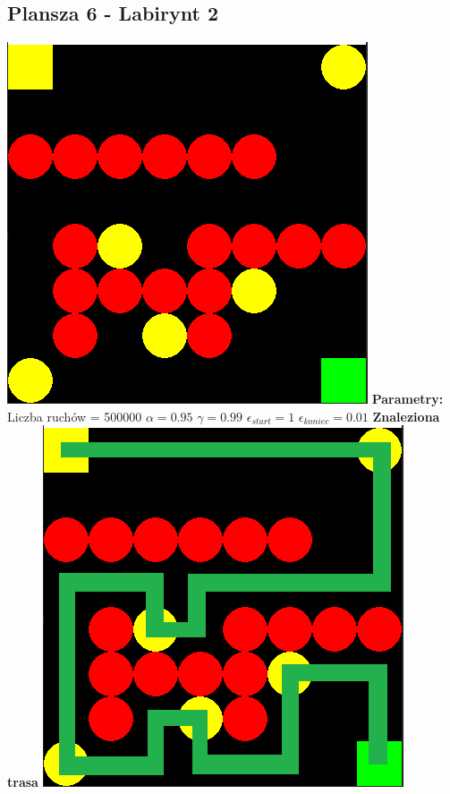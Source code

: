 \documentclass[a4paper,12pt]{article}
\begin{document}
\subsection{Plansza 6 - Labirynt 2}
\includegraphics[scale=0.73]{testy/plansza6.png} \newline
\textbf{Parametry:}
Liczba ruchów = 500000
\newline \(\alpha = 0.95\)
\newline \(\gamma = 0.99\)
\newline \(\epsilon_{start} = 1\)
\newline \(\epsilon_{koniec} = 0.01\) \newline \newline
\textbf{\Large{Znaleziona trasa}} \newline \newline
\includegraphics[scale=0.73]{testy/plansza6trasa.png} \newline \newline
\end{document}
